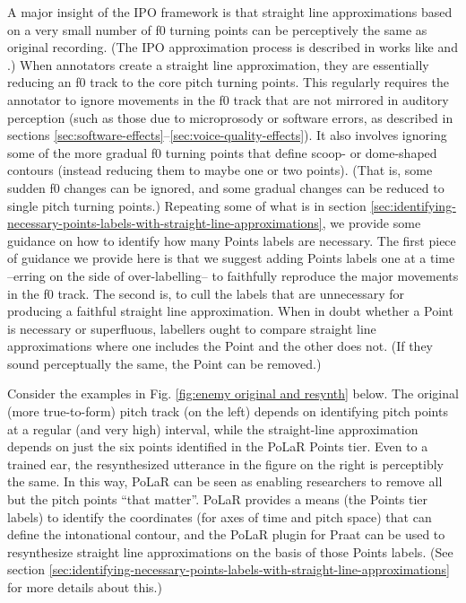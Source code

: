 \documentclass[11pt, twoside]{memoir}
\begin{document}
A major insight of the IPO framework is that straight line approximations based on a very small number of f0 turning points can be perceptively the same as original recording. (The IPO approximation process is described in works like \citealt{dutoit97} and \citealt{rao12}.) When annotators create a straight line approximation, they are essentially reducing an f0 track to the core pitch turning points. This regularly requires the annotator to ignore movements in the f0 track that are not mirrored in auditory perception (such as those due to microprosody or software errors, as described in sections \ref{sec:software-effects}–\ref{sec:voice-quality-effects}). It also involves ignoring some of the more gradual f0 turning points that define scoop- or dome-shaped contours (instead reducing them to maybe one or two points). (That is, some sudden f0 changes can be ignored, and some gradual changes can be reduced to single pitch turning points.) Repeating some of what is in section \ref{sec:identifying-necessary-points-labels-with-straight-line-approximations}, we provide some guidance on how to identify how many Points labels are necessary. The first piece of guidance we provide here is that we suggest adding Points labels one at a time –erring on the side of over-labelling– to faithfully reproduce the major movements in the f0 track. The second is, to cull the labels that are unnecessary for producing a faithful straight line approximation. When in doubt whether a Point is necessary or superfluous, labellers ought to compare straight line approximations where one includes the Point and the other does not. (If they sound perceptually the same, the Point can be removed.) 

Consider the examples in Fig. \ref{fig:enemy original and resynth} below. The original (more true-to-form) pitch track (on the left) depends on identifying pitch points at a regular (and very high) interval, while the straight-line approximation depends on just the six points identified in the PoLaR Points tier. Even to a trained ear, the resynthesized utterance in the figure on the right is perceptibly the same. In this way, PoLaR can be seen as enabling researchers to remove all but the pitch points “that matter”. PoLaR provides a means (the Points tier labels) to identify the coordinates (for axes of time and pitch space) that can define the intonational contour, and the PoLaR plugin for Praat can be used to resynthesize straight line approximations on the basis of those Points labels. (See section \ref{sec:identifying-necessary-points-labels-with-straight-line-approximations} for more details about this.)
\end{document}
